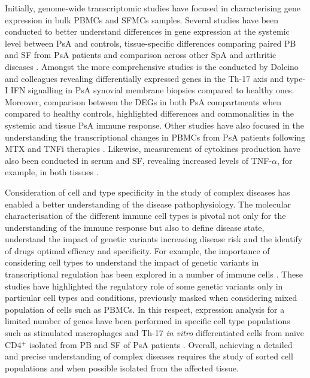 
Initially, genome-wide transcriptomic studies have focused in characterising gene expression in bulk PBMCs and SFMCs samples. Several studies have been conducted to better understand differences in gene expression at the systemic level between PsA and controls, tissue-specific differences comparing paired PB and SF from PsA patients and comparison across other SpA and arthritic diseases \parencite{Stoeckman2006, Batiwalla2005, Gu2002, Dolcino2015}. Amongst the more comprehensive studies is the conducted by Dolcino and colleagues revealing differentially expressed genes in the Th-17 axis and type-I IFN signalling in PsA synovial membrane biopsies compared to healthy ones. Moreover, comparison between the DEGs in both PsA compartments when compared to healthy controls, highlighted differences and commonalities in the systemic and tissue PsA immune response. Other studies have also focused in the understanding the transcriptional changes in PBMCs from PsA patients following MTX and TNFi therapies \parencite{Cuchacovich2014}. Likewise, measurement of cytokines production have also been conducted in serum and SF, revealing increased levels of TNF-$\alpha$, for example, in both tissues \parencite{Ritchlin1999,Li2017}. 

Consideration of cell and type specificity in the study of complex diseases has enabled a better understanding of the disease pathophysiology. The molecular characterisation of the different immune cell types is pivotal not only for the understanding of the immune response but also to define disease state, understand the impact of genetic variants increasing disease risk and the identify of drugs optimal efficacy and specificity. For example, the importance of considering cell types to understand the impact of genetic variants in transcriptional regulation has been explored in a number of immune cells \parencite{eQTL}. These studies have highlighted the regulatory role of some genetic variants only in particular cell types and conditions, previously masked when considering mixed population of cells such as PBMCs. %
In this respect, expression analysis for a limited number of genes have been performed in specific cell type populations such as stimulated macrophages and Th-17 \textit{in vitro} differentiated cells from na\"{i}ve CD4$^+$ isolated from PB and SF of PsA patients \parencite{Antoniv2006, Leipe2010}. Overall, achieving a detailed and precise understanding of complex diseases requires the study of sorted cell populations and when possible isolated from the affected tissue.  



